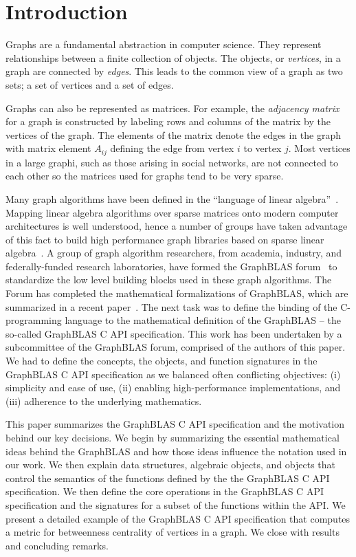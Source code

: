 \section{Introduction}
\label{sec:intro}

Graphs are a fundamental abstraction in computer science.  They represent
relationships between a finite collection of objects.   The objects, or
\emph{vertices}, in a graph are connected by \emph{edges}.  This leads
to the common view of a graph as two sets;  a set of vertices and a set
of edges.

Graphs can also be represented as matrices.   For example, the
\emph{adjacency matrix} for a graph is constructed by labeling rows and
columns of the matrix by the vertices of the graph.  The elements of
the matrix denote the edges in the graph with matrix element $A_{ij}$
defining the edge from vertex $i$ to vertex $j$.  Most
vertices in a large graphi, such as those arising in social networks,
are not connected to each other so the matrices used for graphs tend to
be very sparse.

Many graph algorithms have been defined in the ``language of linear
algebra''~\cite{kepner2011graph}.  Mapping linear algebra algorithms over
sparse matrices onto modern computer architectures is well understood,
hence a number of groups have taken advantage of this fact to build high
performance graph libraries based on sparse linear algebra~\cite{combblas,
gadepally2015graphulo, gpi2016, sundaram2015graphmat}.  A group
of graph algorithm researchers, from academia, industry, and
federally-funded research laboratories, have formed the GraphBLAS
forum~\cite{graphblas_web} to standardize the low level building
blocks used in these graph algorithms.  The Forum has completed the
mathematical formalizations of GraphBLAS, which are summarized in a
recent paper~\cite{mathgraphblas16}.  The next task was to define the
binding of the C-programming language to the mathematical definition of
the GraphBLAS -- the so-called GraphBLAS C API specification.   This work
has been undertaken by a subcommittee of the GraphBLAS forum, comprised of
the authors of this paper.  We had to define the concepts, the objects,
and function signatures in the GraphBLAS C API specification as we
balanced often conflicting objectives: (i) simplicity and ease of use,
(ii) enabling high-performance implementations, and (iii) adherence to
the underlying mathematics.

This paper summarizes the GraphBLAS C API specification and the
motivation behind our key decisions.  We begin by summarizing the
essential mathematical ideas behind the GraphBLAS and how those ideas
influence the notation used in our work.  We then explain data structures,
algebraic objects, and objects that control the semantics of the functions
defined by the the GraphBLAS C API specification.   We then define the
core operations in the GraphBLAS C API specification and the signatures
for a subset of the functions  within the API.  We present a detailed
example of the GraphBLAS C API specification that computes a metric for
betweenness centrality of vertices in a graph.  We close with results
and concluding remarks.
